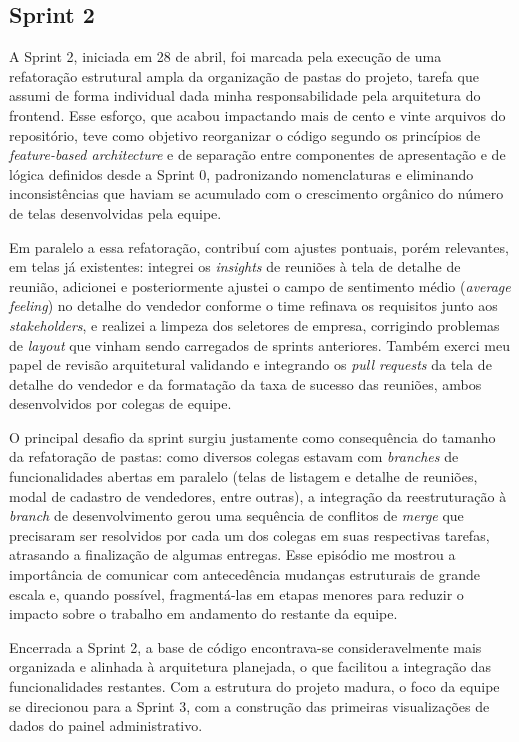 \subsection{Sprint 2}

A Sprint 2, iniciada em 28 de abril, foi marcada pela execução de uma refatoração estrutural ampla da organização de pastas do projeto, tarefa que assumi de forma individual dada minha responsabilidade pela arquitetura do frontend. Esse esforço, que acabou impactando mais de cento e vinte arquivos do repositório, teve como objetivo reorganizar o código segundo os princípios de \textit{feature-based architecture} e de separação entre componentes de apresentação e de lógica definidos desde a Sprint 0, padronizando nomenclaturas e eliminando inconsistências que haviam se acumulado com o crescimento orgânico do número de telas desenvolvidas pela equipe.

Em paralelo a essa refatoração, contribuí com ajustes pontuais, porém relevantes, em telas já existentes: integrei os \textit{insights} de reuniões à tela de detalhe de reunião, adicionei e posteriormente ajustei o campo de sentimento médio (\textit{average feeling}) no detalhe do vendedor conforme o time refinava os requisitos junto aos \textit{stakeholders}, e realizei a limpeza dos seletores de empresa, corrigindo problemas de \textit{layout} que vinham sendo carregados de sprints anteriores. Também exerci meu papel de revisão arquitetural validando e integrando os \textit{pull requests} da tela de detalhe do vendedor e da formatação da taxa de sucesso das reuniões, ambos desenvolvidos por colegas de equipe.

O principal desafio da sprint surgiu justamente como consequência do tamanho da refatoração de pastas: como diversos colegas estavam com \textit{branches} de funcionalidades abertas em paralelo (telas de listagem e detalhe de reuniões, modal de cadastro de vendedores, entre outras), a integração da reestruturação à \textit{branch} de desenvolvimento gerou uma sequência de conflitos de \textit{merge} que precisaram ser resolvidos por cada um dos colegas em suas respectivas tarefas, atrasando a finalização de algumas entregas. Esse episódio me mostrou a importância de comunicar com antecedência mudanças estruturais de grande escala e, quando possível, fragmentá-las em etapas menores para reduzir o impacto sobre o trabalho em andamento do restante da equipe.

Encerrada a Sprint 2, a base de código encontrava-se consideravelmente mais organizada e alinhada à arquitetura planejada, o que facilitou a integração das funcionalidades restantes. Com a estrutura do projeto madura, o foco da equipe se direcionou para a Sprint 3, com a construção das primeiras visualizações de dados do painel administrativo.
